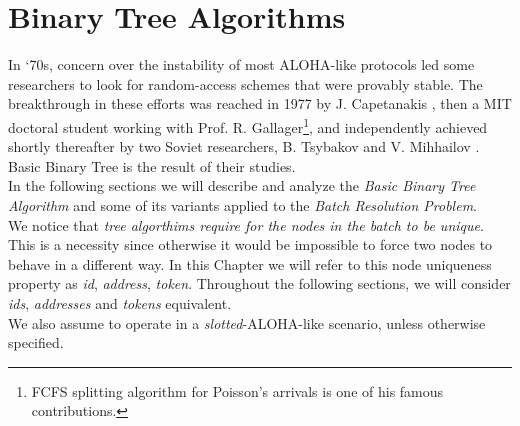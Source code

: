 \documentclass[11pt,a4paper,twoside,openright]{book}
\begin{document}
\section{Binary Tree Algorithms}
In `70s, concern over the instability of most ALOHA-like protocols led some researchers to look for random-access schemes that were provably stable. The breakthrough in these efforts was reached in 1977 by J.  Capetanakis  \cite{capetanakis77}, then a MIT doctoral student working with Prof. R. Gallager\footnote{FCFS splitting algorithm for Poisson's arrivals is one of his famous contributions.}, and independently achieved shortly thereafter by two Soviet researchers, B. Tsybakov and V. Mihhailov \cite{tsybakov}. Basic Binary Tree is the result of their studies.\\
In the following sections we will describe and analyze the \emph{Basic Binary Tree Algorithm} and some of its variants applied to the \emph{Batch Resolution Problem}.\\

We notice that \emph{tree algorthims require for the nodes in the batch to be unique}. This is a necessity since otherwise it would be impossible to force two nodes to behave in a different way. In this Chapter we will refer to this node uniqueness property as \emph{id}, \emph{address}, \emph{token}. Throughout the following sections, we will consider \emph{ids}, \emph{addresses} and \emph{tokens} equivalent.\\

We also assume to operate in a \emph{slotted}-ALOHA-like scenario, unless otherwise specified.
\end{document}
